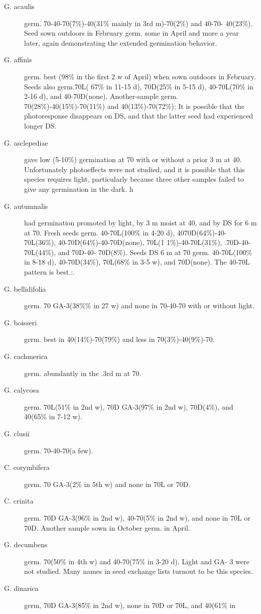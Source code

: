 \begin{description}
\item[G. acaulis] germ. 70-40-70(7\%)-40(31\% mainly in 3rd m)-70(2\%) and 40-70-
40(23\%). Seed sown outdoors in February germ. some in April and more a year later,
again demonstrating the extended germination behavior.
\item[G. affinis] germ. best (98\% in the first 2 w of April) when sown outdoors in
February. Seeds also germ.70L( 67\% in 11-15 d), 70D(25\% in 5-15 d), 40-70L(70\%
in 2-16 d), and 40-70D(none). Another-sample germ. 70(28\%)-40(15\%)-70(11\%) and
40(13\%)-70(72\%); It is possible that the photoresponse disappears on DS, and that
the latter seed had experienced longer DS.
\item[G. asclepediae] gave low (5-10\%) germination at 70 with or without a prior 3 m
at 40. Unfortunately photoeffects were not studied, and it is possible that this species
requires light, particularly because three other samples failed to give any germination
in the dark. h
\item[G. autumnalis] had germination promoted by light, by 3 m moist at 40, and by DS
for 6 m at 70. Fresh seeds germ. 40-70L(100\% in 4-20 d), 4070D(64\%)-40-70L(36\%),
40-70D(64\%)-40-70D(none), 70L(1 1\%)-40-70L(31\%), .70D-40-70L(44\%), and 70D-40-
70D(8\%). Seeds DS 6 m at 70 germ. 40-70L(100\% in 8-18 d), 40-70D(34\%),
70L(68\% in 3-5 w), and 70D(none). The 40-70L pattern is best.:.
\item[G. bellidifolia] germ. 70 GA-3(38\%\% in 27 w) and none in 70-40-70 with or
without light.
\item[G. boisseri] germ. best in 40(14\%)-70(79\%) and less in 70(3\%)-40(9\%)-70.
\item[G. cachmerica] germ. abundantly in the .3rd m at 70.
\item[G. calycosa] germ. 70L(51\% in 2nd w), 70D GA-3(97\% in 2nd w), 70D(4\%), and
40(65\% in 7-12 w).
\item[G. clusii] germ. 70-40-70(a few).
\item[C. corymbifera] germ. 70 GA-3(2\% in 5th w) and none in 70L or 70D.
\item[C. crinita] germ. 70D GA-3(96\% in 2nd w), 40-70(5\% in 2nd w), and none in 70L
or 70D. Another sample sown in October germ. in April.
\item[G. decumbens] germ. 70(50\% in 4th w) and 40-70(75\% in 3-20 d). Light and GA-
3 were not studied. Many names in seed exchange lists turnout to be this species.
\item[G. dinarica] germ, 70D GA-3(85\% in 2nd w), none in 70D or 70L, and 40(61\% in

\end{description}

